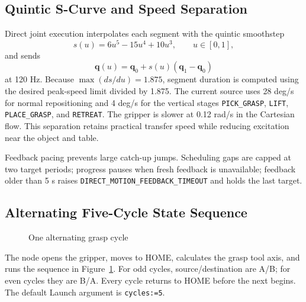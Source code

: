 \documentclass[UTF8,zihao=-4,scheme=chinese,fontset=none]{ctexart}
\begin{document}
\subsection{Quintic S-Curve and Speed Separation}
Direct joint execution interpolates each segment with the quintic smoothstep
\begin{equation}
s(u)=6u^5-15u^4+10u^3,\qquad u\in[0,1],
\end{equation}
and sends
\begin{equation}
\mathbf{q}(u)=\mathbf{q}_0+s(u)(\mathbf{q}_1-\mathbf{q}_0)
\end{equation}
at 120 Hz. Because $\max(ds/du)=1.875$, segment duration is computed using the desired peak-speed limit divided by 1.875. The current source uses 28 deg/s for normal repositioning and 4 deg/s for the vertical stages \texttt{PICK\_GRASP}, \texttt{LIFT}, \texttt{PLACE\_GRASP}, and \texttt{RETREAT}. The gripper is slower at 0.12 rad/s in the Cartesian flow. This separation retains practical transfer speed while reducing excitation near the object and table.

Feedback pacing prevents large catch-up jumps. Scheduling gaps are capped at two target periods; progress pauses when fresh feedback is unavailable; feedback older than 5 s raises \texttt{DIRECT\_MOTION\_FEEDBACK\_TIMEOUT} and holds the last target.

\subsection{Alternating Five-Cycle State Sequence}
\begin{figure}[H]\centering
{}
\caption{One alternating grasp cycle}\label{fig:sequence}
\end{figure}
The node opens the gripper, moves to HOME, calculates the grasp tool axis, and runs the sequence in Figure~\ref{fig:sequence}. For odd cycles, source/destination are A/B; for even cycles they are B/A. Every cycle returns to HOME before the next begins. The default Launch argument is \texttt{cycles:=5}.
\end{document}
